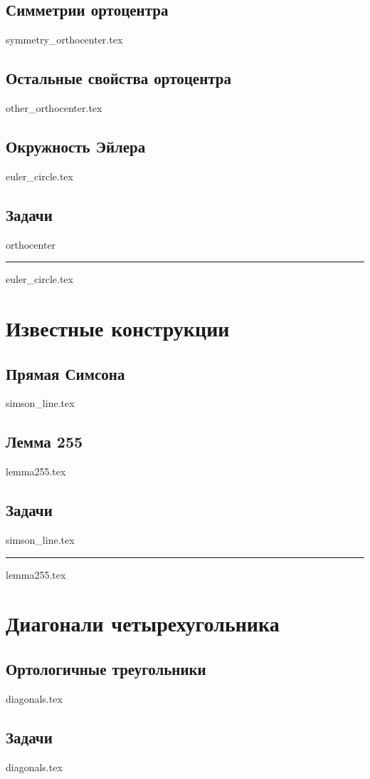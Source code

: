 \documentclass[a5paper, twoside]{article}
\begin{document}
\subsection{Симметрии ортоцентра}
{symmetry_orthocenter.tex}

\subsection{Остальные свойства ортоцентра}
{other_orthocenter.tex}

\subsection{Окружность Эйлера}
{euler_circle.tex}

\subsection*{Задачи}
{orthocenter}

\rule{0.96\textwidth}{0.5pt} 

{euler_circle.tex}

\section{Известные конструкции}

\subsection{Прямая Симсона}

{simson_line.tex}

\subsection{Лемма 255}

{lemma255.tex}

\subsection*{Задачи}
{simson_line.tex}

\rule{\textwidth}{0.5pt} 

{lemma255.tex}

\section{Диагонали четырехугольника}
\subsection{Ортологичные треугольники}

{diagonals.tex}

\subsection*{Задачи}

{diagonals.tex}
\end{document}

